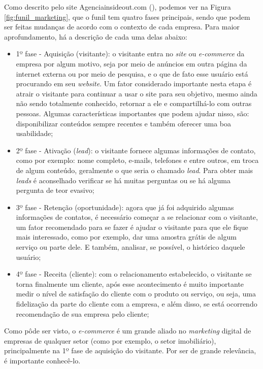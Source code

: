 Como descrito pelo site Agenciainsideout.com (\citeyear{INSIDEOUT:2018}), podemos ver na Figura \ref{fig:funil_marketing}, que o funil tem quatro fases principais, sendo que podem ser feitas mudanças de acordo com o contexto de cada empresa. Para maior aprofundamento, há a descrição de cada uma delas abaixo:

\begin{itemize}
    \item 1º fase - Aquisição (visitante): o visitante entra no \textit{site} ou \textit{e-commerce} da empresa por algum motivo, seja por meio de anúncios em outra página da internet externa ou por meio de pesquisa, e o que de fato esse usuário está procurando em seu \textit{website}. Um fator considerado importante nesta etapa é atrair o visitante para continuar a usar o site para seu objetivo, mesmo ainda não sendo totalmente conhecido, retornar a ele e compartilhá-lo com outras pessoas. Algumas características importantes que podem ajudar nisso, são: disponibilizar conteúdos sempre recentes e também oferecer uma boa usabilidade;
    
    \item 2º fase - Ativação (\textit{lead}): o visitante fornece algumas informações de contato, como por exemplo: nome completo, e-mails, telefones e entre outros, em troca de algum conteúdo, geralmente o que seria o chamado \textit{lead}. Para obter mais \textit{leads} é aconselhado verificar se há muitas perguntas ou se há alguma pergunta de teor evasivo;
    
    \item 3º fase - Retenção (oportunidade): agora que já foi adquirido algumas informações de contatos, é necessário começar a se relacionar com o visitante, um fator recomendado para se fazer é ajudar o visitante para que ele fique mais interessado, como por exemplo, dar uma amostra grátis de algum serviço ou parte dele. E também, analisar, se possível, o histórico daquele usuário;
    
    \item 4º fase - Receita (cliente): com o relacionamento estabelecido, o visitante se torna finalmente um cliente, após esse acontecimento é muito importante medir o nível de satisfação do cliente com o produto ou serviço, ou seja, uma fidelização da parte do cliente com a empresa, e além disso, se está ocorrendo recomendação de sua empresa pelo cliente;

\end{itemize}

Como pôde ser visto, o \textit{e-commerce} é um grande aliado no \textit{marketing} digital de empresas de qualquer setor (como por exemplo, o setor imobiliário), principalmente na 1º fase de aquisição do visitante. Por ser de grande relevância, é importante conhecê-lo.

